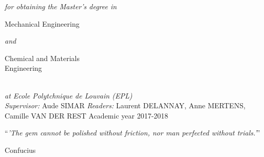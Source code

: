 \documentclass[
11pt, %
british, %
singlespacing, %
headsepline, %
]{MastersDoctoralThesis} %
\begin{document}
\begin{titlepage}
\begin{center}
\vspace{0.6cm}
\large \textit{for obtaining the Master’s degree in}\\[0.3cm] 
\vspace{0.20cm}
\begin{minipage}[t]{0.41\textwidth}
\begin{flushleft} \large
Mechanical Engineering
\end{flushleft}
\end{minipage}
\large \textit{and}
\begin{minipage}[t]{0.4\textwidth}
\begin{flushright} \large
Chemical and Materials \\
\centering \hspace{0.7cm} Engineering
\end{flushright}
\end{minipage}\\%
\vspace{0.7cm}
\large \textit{at Ecole Polytchnique de Louvain (EPL)}\\[1.3cm]
\vfill
\large {\textit{Supervisor:} Aude SIMAR}
\vfill
 \large {\textit{Readers:} Laurent DELANNAY, Anne MERTENS, Camille VAN DER REST}
\vfill
{\large Academic year 2017-2018}\\%
 

\end{center}
\end{titlepage}


\vspace*{0.2\textheight}

\noindent\enquote{\itshape 'The gem cannot be polished without friction, nor man perfected without trials.'}\bigbreak

\hfill Confucius

\end{document}
